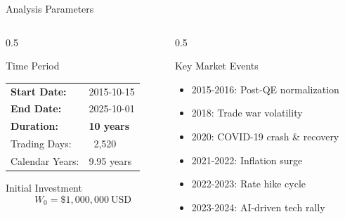 \documentclass[12pt, aspectratio=43]{beamer}
\begin{document}
	\begin{frame}{Analysis Parameters}
		\vspace{-5mm}
		\begin{columns}[T]
			\begin{column}{0.5\textwidth}
				\begin{block}{Time Period}
					\small
					\begin{center}
						\begin{tabular}{ll}
							\toprule
							\textbf{Start Date:} & 2015-10-15 \\
							\textbf{End Date:} & 2025-10-01 \\
							\textbf{Duration:} & \textbf{10 years} \\
							\midrule
							Trading Days: & ~2,520 \\
							Calendar Years: & 9.95 years \\
							\bottomrule
						\end{tabular}
					\end{center}
				\end{block}
				
				\begin{block}{Initial Investment}
					\small
					\[
					W_0 = \$1,000,000\ \text{USD}
					\]
				\end{block}
			\end{column}
			
			\begin{column}{0.5\textwidth}
				\begin{exampleblock}{Key Market Events}
					\small
					\begin{itemize}
						\item 2015-2016: Post-QE normalization
						\item 2018: Trade war volatility
						\item 2020: COVID-19 crash \& recovery
						\item 2021-2022: Inflation surge
						\item 2022-2023: Rate hike cycle
						\item 2023-2024: AI-driven tech rally
					\end{itemize}
				\end{exampleblock}
			\end{column}
		\end{columns}
	\end{frame}
	
\end{document}
